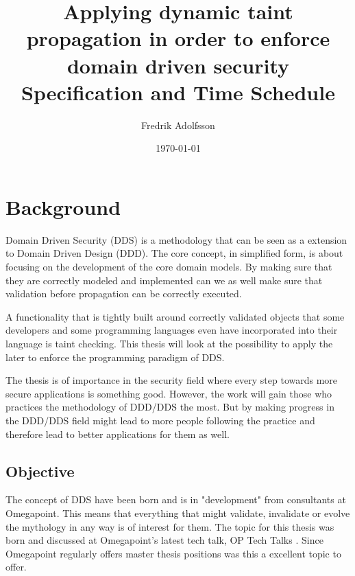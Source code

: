 \documentclass{../kththesis}
\title{Applying dynamic taint propagation in order to enforce domain driven security \\
        \large Specification and Time Schedule}
\author{Fredrik Adolfsson}
\date{\today}
\begin{document}
\frontmatter


\titlepage


\tableofcontents


\mainmatter



\chapter{Background}
Domain Driven Security (DDS) is a methodology that can be seen as a extension to Domain Driven Design (DDD). The core concept, in simplified form, is about focusing on the development of the core domain models. By making sure that they are correctly modeled and implemented can we as well make sure that validation before propagation can be correctly executed. \parencite{evans_2015, EvansEric2004Dd:t, Wilander2009, Johnsson2009}

A functionality that is tightly built around correctly validated objects that some developers and some programming languages even have incorporated into their language is taint checking. \parencite{perl, ruby, Clause2007} This thesis will look at the possibility to apply the later to enforce the programming paradigm of DDS.

The thesis is of importance in the security field where every step towards more secure applications is something good. However, the work will gain those who practices the methodology of DDD/DDS the most. But by making progress in the DDD/DDS field might lead to more people following the practice and therefore lead to better applications for them as well.


\section{Objective}
The concept of DDS have been born and is in "development" from consultants at Omegapoint. This means that everything that might validate, invalidate or evolve the mythology in any way is of interest for them. The topic for this thesis was born and discussed at Omegapoint's latest tech talk, OP Tech Talks \parencite{Tardell}. Since Omegapoint regularly offers master thesis positions was this a excellent topic to offer.
\end{document}
